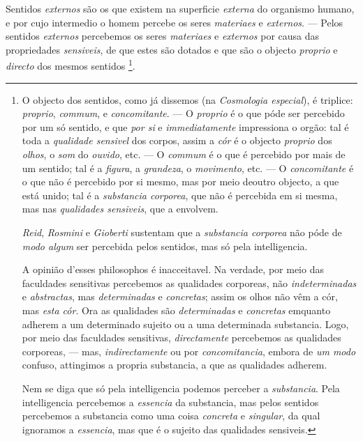 Sentidos \emph{externos} são os que existem na superficie \emph{externa} do organismo humano, e por cujo intermedio o homem percebe os seres \emph{materiaes} e \emph{externos}. --- Pelos sentidos \emph{externos} percebemos os seres \emph{materiaes} e \emph{externos} por causa das propriedades \emph{sensiveis}, de que estes são dotados e que são o objecto \emph{proprio} e \emph{directo} dos mesmos sentidos \footnote{O objecto dos sentidos, como já dissemos (na \emph{Cosmologia especial}), é triplice: \emph{proprio}, \emph{commum}, e \emph{concomitante}. --- O \emph{proprio} é o que póde ser percebido por um só sentido, e que \emph{por si} e \emph{immediatamente} impressiona o orgão: tal é toda a \emph{qualidade sensivel} dos corpos, assim a \emph{cór} é o objecto \emph{proprio} dos \emph{olhos}, o \emph{som} do \emph{ouvido}, etc. --- O \emph{commum} é o que é percebido por mais de um sentido; tal é a \emph{figura}, a \emph{grandeza}, o \emph{movimento}, etc. --- O \emph{concomitante} é o que não é percebido por si mesmo, mas por meio deoutro objecto, a que está unido; tal é a \emph{substancia corporea}, que não é percebida em si mesma, mas nas \emph{qualidades sensiveis}, que a envolvem.\par \emph{Reid}, \emph{Rosmini} e \emph{Gioberti} sustentam que a \emph{substancia corporea} não póde de \emph{modo algum} ser percebida pelos sentidos, mas só pela intelligencia.\par A opinião d'esses philosophos é inacceitavel. Na verdade, por meio das faculdades sensitivas percebemos as qualidades corporeas, não \emph{indeterminadas} e \emph{abstractas}, mas \emph{determinadas} e \emph{concretas}; assim os olhos não vêm a cór, mas \emph{esta cór}. Ora as qualidades são \emph{determinadas} e \emph{concretas} emquanto adherem a um determinado sujeito ou a uma determinada substancia. Logo, por meio das faculdades sensitivas, \emph{directamente} percebemos as qualidades corporeas, --- mas, \emph{indirectamente} ou por \emph{concomitancia}, embora de \emph{um modo} confuso, attingimos a propria substancia, a que as qualidades adherem.\par Nem se diga que só pela intelligencia podemos perceber a \emph{substancia}. Pela intelligencia percebemos a \emph{essencia} da substancia, mas pelos sentidos percebemos a substancia como uma coisa \emph{concreta} e \emph{singular}, da qual ignoramos a \emph{essencia}, mas que é o sujeito das qualidades sensiveis.}.


